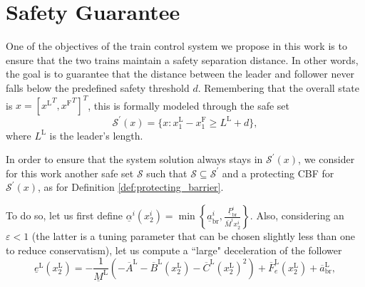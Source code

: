 \section{Safety Guarantee}
\label{sec:SafetyGuarantee}


\begin{comment}
	\begin{definition}[Braking Controller] \label{def:brakingController}
		Given the model present in \eqref{eq:dynamical_system_param_i} we define  $u^i(t)= K_\mathrm{B}(x^i(t))$ the braking controller as follows
		\begin{equation*}
			K_\mathrm{B}(x^i(t))=
			\begin{cases}
				\tilde{u}^i(x^i(t)) \leq 0 \qquad \mathit{if}\;  x_2^i(t) \geq 0\\
				0 \qquad\qquad\qquad \mathit{if}\;  x_2^i(t) = 0.
			\end{cases}     
		\end{equation*}
	\end{definition}
\end{comment}




One of the objectives of the train control system we propose in this work is to ensure that the two trains maintain a safety separation distance. In other words, the goal is to guarantee that the distance between the leader and follower never falls below the predefined safety threshold $d$. Remembering that the overall state is $x=[{x^\mathrm{L}}^T,{x^\mathrm{F}}^T]^T$, this is formally modeled through the safe set
%
\begin{equation} \label{eq:distance}
	\mathcal{S}^\prime(x)=\{x: x_1^\mathrm{L}- x_1^\mathrm{F} \geq  L^\mathrm{L} +d\},
\end{equation}
where $L^\mathrm{L}$ is the leader's length. 

In order to ensure that the system solution always stays in $\mathcal{S}^\prime(x)$, we consider for this work another safe set $\mathcal{S}$ such that $\mathcal{S}\subseteq \mathcal{S}^\prime$ and a protecting CBF for $\mathcal{S}^\prime(x)$, as for Definition \ref{def:protecting_barrier}. 


To do so, let us first define $\underline{\alpha}^i \left( x_2^i\right)=\min \left\{\underline{a}^i_\mathrm{br},\frac{\underline{P}^i_\mathrm{br}}{\bar{M}^i x_2^i} \right\}$. Also, considering an $\varepsilon<1$ (the latter is a tuning parameter that can be chosen slightly less than one to reduce conservatism), let us compute a ``large" deceleration of the follower
\begin{equation*}
	\underline{e}^\mathrm{L}\left(x_2^\mathrm{L}\right)=-\frac{1}{\underline{M}^\mathrm{L}}  \left(-\overline{A}^\mathrm{L}-\overline{B}^\mathrm{L} (x_2^\mathrm{L})- \overline{C}^\mathrm{L}\left(x_2^\mathrm{L}\right)^2\right)+ \overline{F}_e^\mathrm{L}(x_2^\mathrm{L})+\overline{a}^\mathrm{L}_\mathrm{br}, 
\end{equation*}

